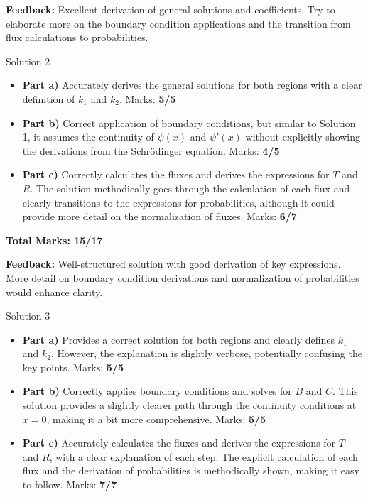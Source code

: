\documentclass[a4paper,11pt]{article}
\begin{document}
\textbf{Feedback:} Excellent derivation of general solutions and coefficients. Try to elaborate more on the boundary condition applications and the transition from flux calculations to probabilities.

Solution 2

\begin{itemize}
    \item \textbf{Part a)} Accurately derives the general solutions for both regions with a clear definition of \(k_1\) and \(k_2\). Marks: \textbf{5/5}
    \item \textbf{Part b)} Correct application of boundary conditions, but similar to Solution 1, it assumes the continuity of \(\psi(x)\) and \(\psi'(x)\) without explicitly showing the derivations from the Schrödinger equation. Marks: \textbf{4/5}
    \item \textbf{Part c)} Correctly calculates the fluxes and derives the expressions for \(T\) and \(R\). The solution methodically goes through the calculation of each flux and clearly transitions to the expressions for probabilities, although it could provide more detail on the normalization of fluxes. Marks: \textbf{6/7}
\end{itemize}

\textbf{Total Marks: 15/17}

\textbf{Feedback:} Well-structured solution with good derivation of key expressions. More detail on boundary condition derivations and normalization of probabilities would enhance clarity.

Solution 3

\begin{itemize}
    \item \textbf{Part a)} Provides a correct solution for both regions and clearly defines \(k_1\) and \(k_2\). However, the explanation is slightly verbose, potentially confusing the key points. Marks: \textbf{5/5}
    \item \textbf{Part b)} Correctly applies boundary conditions and solves for \(B\) and \(C\). This solution provides a slightly clearer path through the continuity conditions at \(x = 0\), making it a bit more comprehensive. Marks: \textbf{5/5}
    \item \textbf{Part c)} Accurately calculates the fluxes and derives the expressions for \(T\) and \(R\), with a clear explanation of each step. The explicit calculation of each flux and the derivation of probabilities is methodically shown, making it easy to follow. Marks: \textbf{7/7}
\end{itemize}
\end{document}

